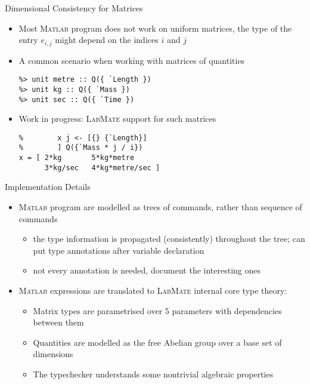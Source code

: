 \documentclass[]{beamer}
\newcommand{\tikzmark}[1]{\tikz[overlay,remember picture,baseline=-0.5ex] \node (#1) {};}
\newcommand{\lm}{\textsc{LabMate}\xspace}
\newcommand{\ma}{\textsc{Matlab}\xspace}
\begin{document}
\begin{frame}[fragile]{Dimensional Consistency for Matrices}
  \begin{itemize}[<+->]
  \item Most \ma program does not work on uniform matrices, the type of the entry $e_{i,j}$ might depend on the indices $i$ and $j$
  \item A common scenario when working with matrices of quantities
\begin{lstlisting}[xleftmargin=0em]
%> dimensions V for Q over `Length, `Mass, `Time
%> unit metre :: Q({ `Length })
%> unit kg :: Q({ `Mass })
%> unit sec :: Q({ `Time })
\end{lstlisting}
\item Work in progress: \lm support for such matrices
\begin{lstlisting}[xleftmargin=0em]
% > x :: [ i <- [{} {`Time}]
%        x j <- [{} {`Length}]
%        ] Q({`Mass * j / i})
x = [ 2*kg       5*kg*metre
      3*kg/sec   4*kg*metre/sec ]
\end{lstlisting}
  \end{itemize}
\end{frame}

\begin{frame}{Implementation Details}
  \begin{itemize}[<+->]
  \item \ma program are modelled as trees of commands, rather than sequence of commands
    \begin{itemize}
    \item the type information is propagated (consistently) throughout the tree; can put type annotations after variable declaration
    \item not every annotation is needed, document the interesting ones
    \end{itemize}
  \item \ma expressions are translated to \lm internal core type theory:
    \begin{itemize}
    \item Matrix types are parametrised over 5 parameters with dependencies between them
    \item Quantities are modelled as the free Abelian group over a base set of dimensions
    \item The typechecker understands some nontrivial algebraic properties
    \end{itemize}
  \end{itemize}
\end{frame}
\end{document}
